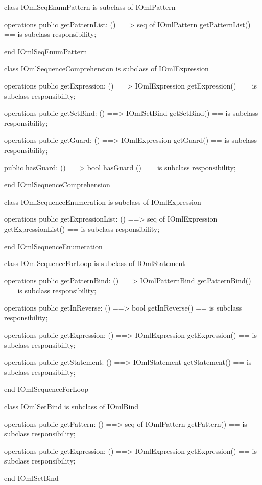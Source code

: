 \begin{vdm_al}
class IOmlSeqEnumPattern
 is subclass of IOmlPattern

operations
  public getPatternList: () ==> seq of IOmlPattern
  getPatternList() == is subclass responsibility;

end IOmlSeqEnumPattern
\end{vdm_al}

\begin{vdm_al}
class IOmlSequenceComprehension
 is subclass of IOmlExpression

operations
  public getExpression: () ==> IOmlExpression
  getExpression() == is subclass responsibility;

operations
  public getSetBind: () ==> IOmlSetBind
  getSetBind() == is subclass responsibility;

operations
  public getGuard: () ==> IOmlExpression
  getGuard() == is subclass responsibility;

  public hasGuard: () ==> bool
  hasGuard () == is subclass responsibility;

end IOmlSequenceComprehension
\end{vdm_al}

\begin{vdm_al}
class IOmlSequenceEnumeration
 is subclass of IOmlExpression

operations
  public getExpressionList: () ==> seq of IOmlExpression
  getExpressionList() == is subclass responsibility;

end IOmlSequenceEnumeration
\end{vdm_al}

\begin{vdm_al}
class IOmlSequenceForLoop
 is subclass of IOmlStatement

operations
  public getPatternBind: () ==> IOmlPatternBind
  getPatternBind() == is subclass responsibility;

operations
  public getInReverse: () ==> bool
  getInReverse() == is subclass responsibility;

operations
  public getExpression: () ==> IOmlExpression
  getExpression() == is subclass responsibility;

operations
  public getStatement: () ==> IOmlStatement
  getStatement() == is subclass responsibility;

end IOmlSequenceForLoop
\end{vdm_al}

\begin{vdm_al}
class IOmlSetBind
 is subclass of IOmlBind

operations
  public getPattern: () ==> seq of IOmlPattern
  getPattern() == is subclass responsibility;

operations
  public getExpression: () ==> IOmlExpression
  getExpression() == is subclass responsibility;

end IOmlSetBind
\end{vdm_al}

